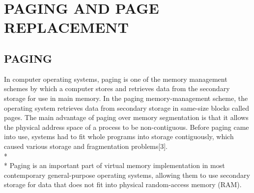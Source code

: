 \documentclass[12pt, oneside, a4paper]{report}
\begin{document}
\section*{PAGING AND PAGE REPLACEMENT}
\subsection*{PAGING}
In computer operating systems, paging is one of the memory management schemes by which a computer stores and retrieves data from the secondary storage for use in main memory. In the paging memory-management scheme, the operating system retrieves data from secondary storage in same-size blocks called pages. The main advantage of paging over memory segmentation is that it allows the physical address space of a process to be non-contiguous. Before paging came into use, systems had to fit whole programs into storage contiguously, which caused various storage and fragmentation problems[3].
\\*
\\*
Paging is an important part of virtual memory implementation in most contemporary general-purpose operating systems, allowing them to use secondary storage for data that does not fit into physical random-access memory (RAM).
\end{document}
